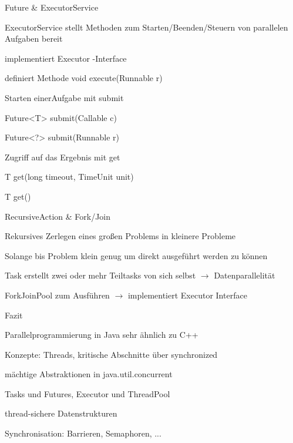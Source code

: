 \documentclass[10pt]{article}
\begin{document}
\begin{itemize*}
\begin{itemize*}
\begin{itemize*}
\begin{itemize*}
    \end{itemize*}
    \item Future \& ExecutorService
    \begin{itemize*}
      \item ExecutorService stellt Methoden zum Starten/Beenden/Steuern von parallelen Aufgaben bereit
      \item implementiert Executor -Interface
      \begin{itemize*}
        \item definiert Methode void execute(Runnable r)
      \end{itemize*}
      \item  Starten einerAufgabe mit submit
      \begin{itemize*}
        \item Future<T> submit(Callable c)
        \item Future<?> submit(Runnable r)
      \end{itemize*}
      \item Zugriff auf das Ergebnis mit get
      \begin{itemize*}
        \item T get(long timeout, TimeUnit unit)
        \item T get()
      \end{itemize*}
    \end{itemize*}
    \item RecursiveAction \& Fork/Join
    \begin{itemize*}
      \item Rekursives Zerlegen eines großen Problems in kleinere Probleme
      \item Solange bis Problem klein genug um direkt ausgeführt werden zu können
      \item Task erstellt zwei oder mehr Teiltasks von sich selbst $\rightarrow$ Datenparallelität
      \item ForkJoinPool zum Ausführen $\rightarrow$ implementiert Executor Interface
    \end{itemize*}
    \item Fazit
    \begin{itemize*}
      \item Parallelprogrammierung in Java sehr ähnlich zu C++
      \item Konzepte: Threads, kritische Abschnitte über synchronized
      \item mächtige Abstraktionen in java.util.concurrent
      \begin{itemize*}
        \item Tasks und Futures, Executor und ThreadPool
        \item thread-sichere Datenstrukturen
        \item Synchronisation: Barrieren, Semaphoren, ...
      \end{itemize*}
    \end{itemize*}
  \end{itemize*}
\end{itemize*}


\end{itemize*}
\end{document}
